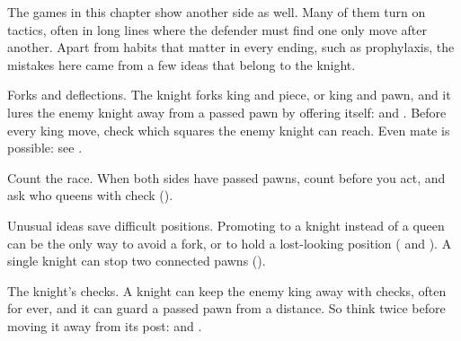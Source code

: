 The games in this chapter show another side as well. Many of them turn on tactics, often in long
lines where the defender must find one only move after another. Apart from habits that matter in
every ending, such as prophylaxis, the mistakes here came from a few ideas that belong to the
knight.

Forks and deflections. The knight forks king and piece, or king and pawn,
and it lures the enemy knight away from a passed pawn by offering itself:
 and . Before every king move,
check which squares the enemy knight can reach. Even mate is possible: see
.

Count the race. When both sides have passed pawns, count before you act, and ask who queens
with check ().

Unusual ideas save difficult positions. Promoting to a knight instead of a queen can be the
only way to avoid a fork, or to hold a lost-looking position
( and ). A single knight can
stop two connected pawns
().

The knight's checks. A knight can keep the enemy king away with checks, often for ever, and
it can guard a passed pawn from a distance. So think twice before moving it away from its post:
 and .

